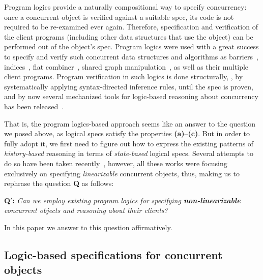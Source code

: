 Program logics provide a naturally compositional way to specify
concurrency: once a concurrent object is verified against a suitable
spec, its code is not required to be re-examined ever
again. Therefore, specification and verification of the client
programs (including other data structures that use the object) can be
performed out of the object's spec.
%
Program logics were used with a great success to specify and verify
such concurrent data structures and algorithms as
barriers~\cite{Dodds-al:POPL11,Hobor-Gherghina:ESOP11},
indices~\cite{ArrozPincho-al:OOPSLA11}, flat
combiner~\cite{Turon-al:ICFP13,Sergey-al:ESOP15}, shared graph
manipulation~\cite{Raad-al:ESOP15,Sergey-al:PLDI15}, as well as their
multiple client programs.
%
Program verification in such logics is done structurally, \ie, by
systematically applying syntax-directed inference rules, until the
spec is proven, and by now several mechanized tools for logic-based
reasoning about concurrency has been
released~\cite{Sergey-al:PLDI15,Appel-al:BOOK14}.

That is, the program logics-based approach seems like an answer to the
question we posed above, as logical specs satisfy the properties
\textbf{(a)}--\textbf{(c)}. But in order to fully adopt it, we first
need to figure out how to express the existing patterns of
\emph{history-based} reasoning in terms of \emph{state-based} logical
specs.
%
Several attempts to do so have been taken
recently~\cite{Fu-al:CONCUR10,Gotsman-al:ESOP13,Sergey-al:ESOP15,OHearn-al:PODC10},
however, all these works were focusing exclusively on specifying
\emph{linearizable} concurrent objects, thus, making us to rephrase
the question \textbf{Q} as follows:

\vspace{4pt}
\noindent
\textbf{Q$'$:} \emph{Can we employ existing program logics for
  specifying \textbf{non-linearizable} concurrent objects and
  reasoning about their clients?}
% 
\vspace{4pt}

\vspace{-8pt}
\noindent
In this paper we answer to this question affirmatively.

\subsection{Logic-based specifications for concurrent objects}
\label{sec:logic-based-spec}

